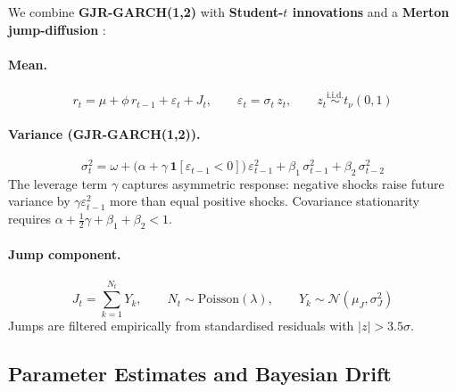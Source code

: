 \documentclass[11pt, a4paper]{article}
\begin{document}
We combine \textbf{GJR-GARCH(1,2)} \citep{glosten1993} with \textbf{Student-$t$ innovations} and a \textbf{Merton jump-diffusion} \citep{merton1976}:

\paragraph{Mean.}
\begin{equation}
  r_t = \mu + \phi\,r_{t-1} + \varepsilon_t + J_t, \qquad
  \varepsilon_t = \sigma_t\,z_t, \qquad
  z_t \overset{\text{i.i.d.}}{\sim} t_\nu(0,1)
  \label{eq:mean}
\end{equation}

\paragraph{Variance (GJR-GARCH(1,2)).}
\begin{equation}
  \sigma^2_t = \omega + \bigl(\alpha + \gamma\,\mathbf{1}[\varepsilon_{t-1}<0]\bigr)\,\varepsilon^2_{t-1}
             + \beta_1\,\sigma^2_{t-1} + \beta_2\,\sigma^2_{t-2}
  \label{eq:var}
\end{equation}
The leverage term $\gamma$ captures asymmetric response: negative shocks raise future variance by $\gamma\varepsilon^2_{t-1}$ more than equal positive shocks. Covariance stationarity requires $\alpha+\tfrac12\gamma+\beta_1+\beta_2 < 1$.

\paragraph{Jump component.}
\begin{equation}
  J_t = \sum_{k=1}^{N_t} Y_k, \qquad N_t\sim\mathrm{Poisson}(\lambda), \qquad Y_k\sim\mathcal{N}(\mu_J,\sigma_J^2)
  \label{eq:jump}
\end{equation}
Jumps are filtered empirically from standardised residuals with $|z|>3.5\sigma$.

\subsection{Parameter Estimates and Bayesian Drift}
\label{sec:params}
\end{document}
